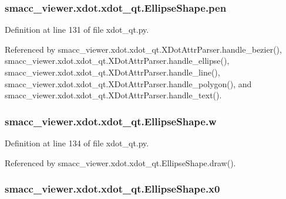 \subsubsection[{\texorpdfstring{pen}{pen}}]{\setlength{\rightskip}{0pt plus 5cm}smacc\+\_\+viewer.\+xdot.\+xdot\+\_\+qt.\+Ellipse\+Shape.\+pen}\hypertarget{classsmacc__viewer_1_1xdot_1_1xdot__qt_1_1EllipseShape_a6423219aa041c492b80be25bd4f54753}{}\label{classsmacc__viewer_1_1xdot_1_1xdot__qt_1_1EllipseShape_a6423219aa041c492b80be25bd4f54753}


Definition at line 131 of file xdot\+\_\+qt.\+py.



Referenced by smacc\+\_\+viewer.\+xdot.\+xdot\+\_\+qt.\+X\+Dot\+Attr\+Parser.\+handle\+\_\+bezier(), smacc\+\_\+viewer.\+xdot.\+xdot\+\_\+qt.\+X\+Dot\+Attr\+Parser.\+handle\+\_\+ellipse(), smacc\+\_\+viewer.\+xdot.\+xdot\+\_\+qt.\+X\+Dot\+Attr\+Parser.\+handle\+\_\+line(), smacc\+\_\+viewer.\+xdot.\+xdot\+\_\+qt.\+X\+Dot\+Attr\+Parser.\+handle\+\_\+polygon(), and smacc\+\_\+viewer.\+xdot.\+xdot\+\_\+qt.\+X\+Dot\+Attr\+Parser.\+handle\+\_\+text().

\subsubsection[{\texorpdfstring{w}{w}}]{\setlength{\rightskip}{0pt plus 5cm}smacc\+\_\+viewer.\+xdot.\+xdot\+\_\+qt.\+Ellipse\+Shape.\+w}\hypertarget{classsmacc__viewer_1_1xdot_1_1xdot__qt_1_1EllipseShape_abce028ffaabc33b92349dc8ee873f7e1}{}\label{classsmacc__viewer_1_1xdot_1_1xdot__qt_1_1EllipseShape_abce028ffaabc33b92349dc8ee873f7e1}


Definition at line 134 of file xdot\+\_\+qt.\+py.



Referenced by smacc\+\_\+viewer.\+xdot.\+xdot\+\_\+qt.\+Ellipse\+Shape.\+draw().

\subsubsection[{\texorpdfstring{x0}{x0}}]{\setlength{\rightskip}{0pt plus 5cm}smacc\+\_\+viewer.\+xdot.\+xdot\+\_\+qt.\+Ellipse\+Shape.\+x0}\hypertarget{classsmacc__viewer_1_1xdot_1_1xdot__qt_1_1EllipseShape_abdb288715129f85135c3e419a9e12959}{}\label{classsmacc__viewer_1_1xdot_1_1xdot__qt_1_1EllipseShape_abdb288715129f85135c3e419a9e12959}


